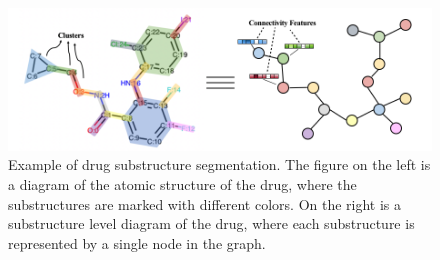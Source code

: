 \begin{figure}[!htbp] 
\centering
\includegraphics[width=1\textwidth]  {imgs/split_diagram.png}
{Example of drug substructure segmentation. The figure on the left is a diagram of the atomic structure of the drug, where the substructures are marked with different colors. On the right is a substructure level diagram of the drug, where each substructure is represented by a single node in the graph.}
\label{fig:split_diagram}
\end{figure}


